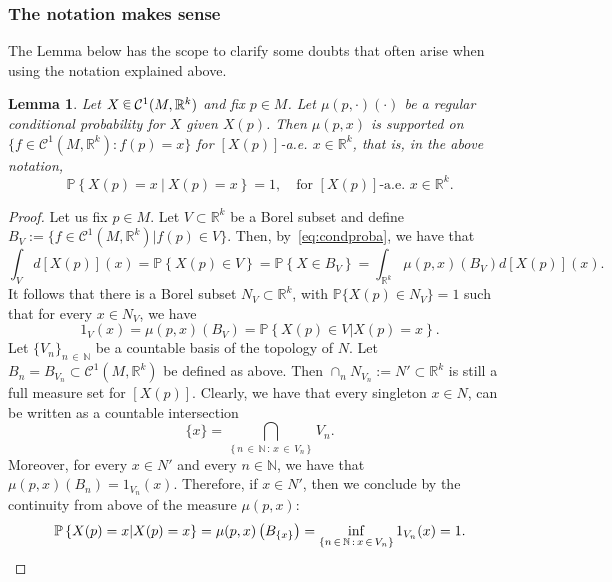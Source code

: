 \documentclass[10pt]{amsart}
\newtheorem{lemm}[theo]{Lemma}\newtheorem{prop}[theo]{Proposition}\newtheorem{coro}[theo]{Corollary}\newtheorem{conj}[theo]{Conjecture}
\theoremstyle{definition}\newtheorem{defi}[theo]{Definition}\newtheorem{rema}[theo]{Remark}\newtheorem{exam}[theo]{Example}\newtheorem{exem}[theo]{Example}\newtheorem{nota}[theo]{Notation}
\newcommand{\R}{\mathbb{R}}
\newcommand{\N}{\mathbb{N}}
\newcommand{\PP}{\mathbb{P}}
\newcommand{\mC}{\mathcal{C}}
\newcommand*\randin{
\mathchoice {\raisebox{-.35ex}{$\displaystyle{^\subset}$}\mkern-11.5mu\raisebox{+.45ex}{$\displaystyle{_\subset}$}} {\mkern+1mu\raisebox{-.27ex}{$\textstyle{^\subset}$}\mkern-11.7mu\raisebox{+.45ex}{$\textstyle{_\subset}$}} {\raisebox{.35ex}{$\scriptstyle\subset$}\mkern-14mu\raisebox{-.15ex}{$\scriptstyle\subset$}} {\raisebox{.3ex}{$\scriptscriptstyle\subset$}\mkern-13.5mu\raisebox{-.10ex}{$\scriptscriptstyle\subset$}}}
\begin{document}
\subsubsection{The notation makes sense}

The Lemma below has the scope to clarify some doubts that often arise when using the notation explained above.

\begin{lemm}\label{lem:stupidconditioning}
Let $X\,\randin\, \mC^1(M,\R^k)$ and fix $p\in M$. Let $\mu(p,\cdot)(\cdot)$ be a regular conditional probability for $X$ given $X(p)$. Then $\mu(p,x)$ is supported on $\{f\in \mC^1(M,\R^k)\colon f(p)=x\}$ for $[X(p)]$-a.e. $x\in \R^k$, that is, in the above notation,
\begin{equation*}
\PP\left\{ X(p)=x \ \Big|\ X(p)=x\right\}=1,\quad \text{for $[X(p)]$-a.e. $x\in \R^k$.}
\end{equation*}
\end{lemm}

\begin{proof}
Let us fix $p\in M$. Let $V\subset \R^k$ be a Borel subset and define $B_V:=\{f\in\mC^1(M,\R^k)|f(p)\in V\}$. Then, by~\cref{eq:condproba}, we have that
\begin{equation*}
\int_{V}d[X(p)](x)=
\PP\left\{ X(p)\in V\right\}=\PP\left\{ X\in B_V\right\} =\int_{\R^k}\mu(p,x)(B_V)d[X(p)](x).
\end{equation*}
It follows that there is a Borel subset $N_V\subset \R^k$, with $\PP\{X(p)\in N_V\}=1$ such that for every $x\in N_V$, we have
\begin{equation*}
1_V(x)=\mu(p,x)(B_V)=\PP\left\{ X(p)\in V|X(p)=x\right\}.
\end{equation*}
Let $\{V_n\}_{n\,\in\,\N}$ be a countable basis of the topology of $N$. Let $B_n=B_{V_n}\subset \mC^1(M,\R^k)$ be defined as above. Then $\cap_n N_{V_n}:=N'\subset \R^k$ is still a full measure set for $[X(p)]$. Clearly, we have that every singleton $x\in N$, can be written as a countable intersection
\begin{equation*}
\{x\}=\bigcap_{\left\{ n\,\in\,\N\, :\, x\,\in\,V_n\right\}}V_n.
\end{equation*}
Moreover, for every $x\in N'$ and every $n\in\N$, we have that $\mu(p,x)(B_n)=1_{V_n}(x)$. Therefore, if $x\in N'$, then we conclude by the continuity from above of the measure $\mu(p,x)$:
\begin{equation*}
\PP\left\{ X(p)=x|X(p)= x \right\}=\mu(p,x)\left( B_{\left\{ x\right\}}\right)=\inf_{\left\{n\,\in\,\N\,:\, x\,\in\,V_n\right\}} 1_{V_n}(x)=1.\qedhere
\end{equation*}
\end{proof}
\end{document}
